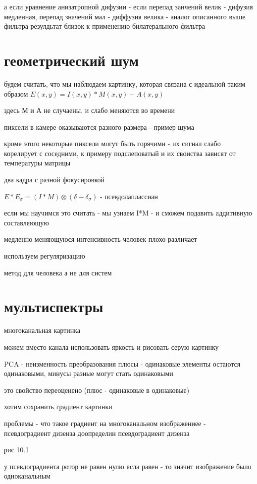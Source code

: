 \documentclass[]{report}
\begin{document}
а если уравнение анизатропной дифузии - если перепад занчений велик - дифузия медленная, перепад значений мал - диффузия велика - аналог описанного выше фильтра
резулдьтат близок к применению билатерального фильтра

\section{геометрический шум}

будем считать, что мы наблюдаем картинку, которая связана с идеальной таким образом
$E(x,y)=I(x,y)*M(x,y)+A(x,y)$

здесь М и А не случаены, и слабо меняются во времени

пиксели в камере оказываются разного размера - пример шума

кроме этого некоторые пиксели могут быть горячими - их сигнал слабо корелирует с соседними, к примеру подслеповатый и их своиства зависят от температуры матрицы

два кадра с разной фокусировкой

$E*E_\sigma=(I*M)\otimes(\delta-\delta_\sigma)$ - псевдолаплассиан

если мы научимся это считать - мы узнаем I*M - и сможем подавить аддитивную составляющую

медленно меняющуюся интенсивность человек плохо различает

используем регуляризацию

метод для человека а не для систем

\section{мультиспектры}

многоканальная картинка

можем вместо канала использовать яркость и рисовать серую картинку

PCA - неизменность преобразования
плюсы - одинаковые элементы остаются одинаковыми, минусы разные могут стать одинаковыми

это свойство переоценено (плюс - одинаковые в одинаковые)

хотим сохранить градиент картинки

проблемы - что такое градиент на многоканальном изображениее - псевдоградиент дизенза
доопределин псевдоградиент дизенза

рис 10.1

у псевдоградиента ротор не равен нулю
есла равен - то значит изображение было одноканальным
\end{document}
